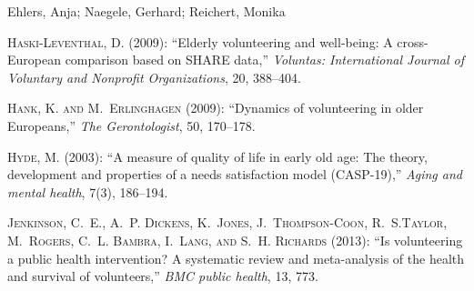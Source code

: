 \documentclass[10pt, letterpaper]{article}
\begin{document}
\begin{spacing}{1.4}
\begin{thebibliography}{87}
Ehlers, Anja; Naegele, Gerhard; Reichert, Monika

\textsc{Haski-Leventhal, D.} (2009): \enquote{Elderly volunteering and
  well-being: A cross-European comparison based on SHARE data,} \emph{Voluntas:
  International Journal of Voluntary and Nonprofit Organizations}, 20, 388--404.
  
  
\textsc{Hank, K. and M.~Erlinghagen} (2009): \enquote{Dynamics of volunteering in older Europeans,} \emph{The Gerontologist}, 50, 170--178.  

\textsc{Hyde, M.} (2003): \enquote{A measure of quality of life in early old age: The theory, development and properties of a needs satisfaction model (CASP-19),} \emph{Aging and mental health}, 7(3), 186--194. 


\textsc{Jenkinson, C.~E., A.~P. Dickens, K.~Jones, J.~Thompson-Coon, R.~S.Taylor, M.~Rogers, C.~L. Bambra, I.~Lang, and S.~H. Richards} (2013):
  \enquote{Is volunteering a public health intervention? A systematic review and meta-analysis of the health and survival of volunteers,} \emph{BMC public health}, 13, 773.



\end{thebibliography}
\end{spacing}
\end{document}

